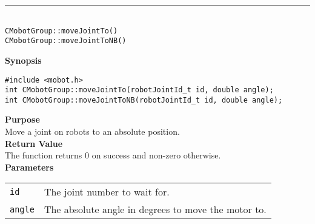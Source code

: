 \noindent
\vspace{5pt}
\rule{4.5in}{0.015in}\\
\noindent
{\LARGE \texttt{CMobotGroup::moveJointTo()}}\\
{\LARGE \texttt{CMobotGroup::moveJointToNB()}}\\
{}

\noindent
{\bf Synopsis}
\vspace{-8pt}
\begin{verbatim}
#include <mobot.h>
int CMobotGroup::moveJointTo(robotJointId_t id, double angle);
int CMobotGroup::moveJointToNB(robotJointId_t id, double angle);
\end{verbatim}

\noindent
{\bf Purpose}\\
Move a joint on robots to an absolute position.\\

\noindent
{\bf Return Value}\\
The function returns 0 on success and non-zero otherwise.\\

\noindent
{\bf Parameters}\\
\vspace{-0.1in}
\begin{description}
\item               
\begin{tabular}{p{10 mm}p{145 mm}}
\texttt{id} & The joint number to wait for. \\
\texttt{angle} & The absolute angle in degrees to move the motor to.  \\
\end{tabular}
\end{description}

